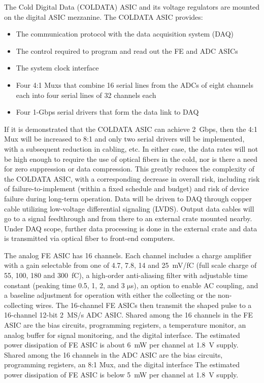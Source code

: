 The Cold Digital Data (COLDATA) ASIC and its voltage regulators are mounted on the digital ASIC mezzanine.
The COLDATA ASIC provides:
\begin{itemize}
\item The communication protocol with the data acquisition system (DAQ)
\item The control required to program and read out the FE and ADC ASICs
\item The system clock interface
\item Four 4:1 Muxs that combine 16 serial lines from the ADCs of eight channels each into four serial lines of 32 channels each
\item Four 1-Gbps serial drivers that form the data link to DAQ
\end{itemize}
If it is demonstrated that the COLDATA ASIC can achieve 2~Gbps,
then the 4:1 Mux will be increased to 8:1 and only two serial drivers will be implemented,
with a subsequent reduction in cabling, etc.
In either case, the data rates will not be high enough to require the use of optical fibers in the cold,
nor is there a need for zero suppression or data compression.
This greatly reduces the complexity of the COLDATA ASIC, with a corresponding decrease in overall risk,
including risk of failure-to-implement (within a fixed schedule and budget)
and risk of device failure during long-term operation.
Data will be driven to DAQ through copper cable utilizing low-voltage differential signaling (LVDS).
Output data cables will go to a signal feedthrough and from there to an external crate mounted nearby.
Under DAQ scope, further data processing is done in the external crate
and data is transmitted via optical fiber to front-end computers.

The analog FE ASIC has 16 channels.
Each channel includes a charge amplifier with a gain selectable from one of 4.7, 7.8, 14 and 25~mV/fC
(full scale charge of 55, 100, 180 and 300~fC),
a high-order anti-aliasing filter with adjustable time
constant (peaking time 0.5, 1, 2, and 3 $\mathrm{\mu}$s),
an option to enable AC coupling,
and a baseline adjustment for operation with either the collecting or the non-collecting wires.
The 16-channel FE ASICs then transmit the shaped pulse to a 16-channel 12-bit 2~MS/s ADC ASIC.
Shared among the 16 channels in the FE ASIC are the bias circuits, programming registers,
a temperature monitor, an analog buffer for signal monitoring, and the digital interface.
The estimated power dissipation of FE ASIC is about 6~mW per channel at 1.8~V supply.
Shared among the 16 channels in the ADC ASIC are the bias circuits, programming registers,
an 8:1 Mux, and the digital interface
The estimated power dissipation of FE ASIC is below 5~mW per channel at 1.8~V supply.


